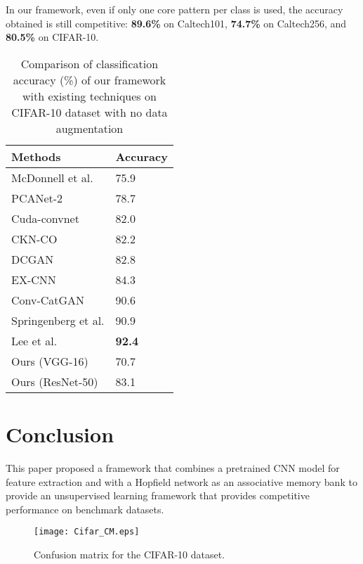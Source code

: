 \documentclass[conference]{IEEEtran}
\begin{document}
In our  framework, even if only one core pattern per class is used, the accuracy obtained is still  competitive: \textbf{89.6\%} on Caltech101, \textbf{74.7\%} on Caltech256, and \textbf{80.5\%} on CIFAR-10.

\begin {table}[t!]
\caption {Comparison of classification accuracy (\%) of our framework with existing techniques  on CIFAR-10 dataset with no data augmentation}
\begin{center}
\begin{tabular}{ |p{3.0cm}||M{2.0cm}| }
 \hline
 Methods& Accuracy\\
 \hline
 McDonnell et al.\cite{mcdonnell2015enhanced}   & 75.9 \\
 PCANet-2\cite{chan2015pcanet}   & 78.7 \\
Cuda-convnet\cite{Krizhevsky:2014:Misc} & 82.0 \\
CKN-CO\cite{mairal2014convolutional} & 82.2 \\
 DCGAN \cite{radford2015unsupervised} & 82.8 \\
 EX-CNN \cite{exemplar1} & 84.3 \\
 Conv-CatGAN \cite{catg} & 90.6 \\
 Springenberg et al.\cite{springenberg2014striving} & 90.9 \\
 Lee et al.\cite{lee2016generalizing} & \textbf{92.4} \\
 \hline
 Ours (VGG-16)&70.7 \\
 Ours (ResNet-50)&83.1 \\
 \hline
\end{tabular}
\label{tab:cs2}
\end{center}
\end{table}

\section{Conclusion}\label{con}
This paper proposed a framework that combines a  pretrained CNN model for feature extraction and  with  a Hopfield network as  an associative memory bank
to provide an unsupervised learning framework that provides competitive performance on benchmark datasets. 


\begin{figure}[htbp]
    \centering
    \texttt{[image: Cifar\_CM.eps]}
    \caption{Confusion matrix for the CIFAR-10 dataset.}
    \label{fig:cifarcm}
\end{figure}


\nocite{Krizhevsky:2014:Misc}

\end{document}
